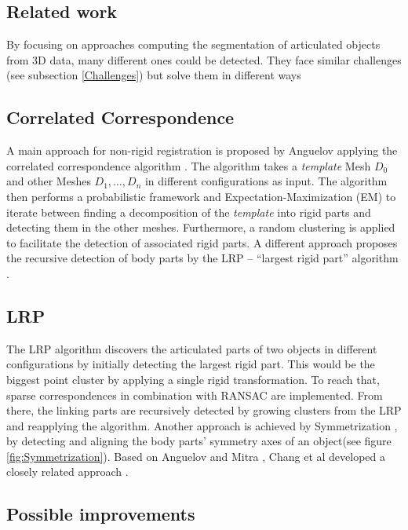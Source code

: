 \subsection{Related work}
\label{sec:RelatedWork}

By focusing on approaches computing the segmentation of articulated objects from 3D data, many different ones could be detected. They face similar challenges (see subsection \ref{Challenges}) but solve them in different ways
\subsection{Correlated Correspondence}

A main approach for non-rigid registration is proposed by Anguelov \cite{Anguelov04} applying the correlated correspondence algorithm \cite{CorrelatedCorrespondance}. The algorithm takes a \textit{template} Mesh $D_0$ and other Meshes $D_1,\ldots,D_n$ in different configurations as input. The algorithm then performs a probabilistic framework and Expectation-Maximization (EM) to iterate between finding a decomposition of the \textit{template} into rigid parts and detecting them in the other meshes. Furthermore, a random clustering is applied to facilitate the detection of associated rigid parts.
A different approach proposes the recursive detection of body parts by the LRP -- ``largest rigid part'' algorithm \cite {guo2016correspondence}. 
\subsection{LRP}
The LRP algorithm discovers the articulated parts of two objects in different configurations by initially detecting the largest rigid part. This would be the biggest point cluster by applying a single rigid transformation. To reach that, sparse correspondences in combination with RANSAC are implemented. From there, the linking parts are recursively detected by growing clusters from the LRP and reapplying the algorithm. 
Another approach is achieved by Symmetrization \cite{Mitra07}, by detecting and aligning the body parts’ symmetry axes of an object(see figure \ref{fig:Symmetrization}). Based on Anguelov \cite{Anguelov04} and Mitra \cite{Mitra07}, Chang et al developed a closely related approach \cite{chang08articulated} \cite{chang09range}.

\subsection{Possible improvements}


